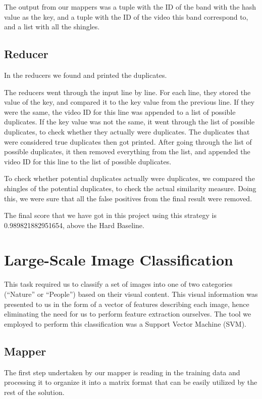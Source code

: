 \documentclass[a4paper, 11pt]{article}
\begin{document}
The output from our mappers was a tuple with the ID of the band with the hash value as the key, and a tuple with the ID of the video this band correspond to, and a list with all the shingles.

\subsection*{Reducer}
In the reducers we found and printed the duplicates.

The reducers went through the input line by line. For each line, they stored the value of the key, and compared it to the key value from the previous line. If they were the same, the video ID for this line was appended to a list of possible duplicates. If the key value was not the same, it went through the list of possible duplicates, to check whether they actually were duplicates. The duplicates that were considered true duplicates then got printed. After going through the list of possible duplicates, it then removed everything from the list, and appended the video ID for this line to the list of possible duplicates.

To check whether potential duplicates actually were duplicates, we compared the shingles of the potential duplicates, to check the actual similarity measure. Doing this, we were sure that all the false positives from the final result were removed.

The final score that we have got in this project using this strategy is 0.989821882951654, above the Hard Baseline.

\newpage

\section*{Large-Scale Image Classification}

This task required us to classify a set of images into one of two categories (``Nature'' or ``People'') based on their visual content. This visual information was presented to us in the form of a vector of features describing each image, hence eliminating the need for us to perform feature extraction ourselves. The tool we employed to perform this classification was a Support Vector Machine (SVM).

\subsection*{Mapper}
The first step undertaken by our mapper is reading in the training data and processing it to organize it into a matrix format that can be easily utilized by the rest of the solution.
\end{document}

